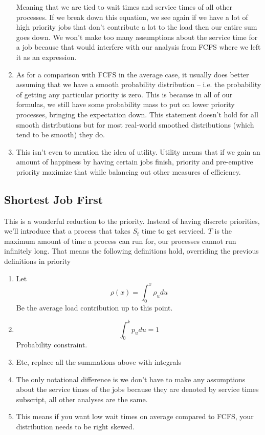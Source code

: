 \begin{enumerate}
  Meaning that we are tied to wait times and service times of all other processes.
  If we break down this equation, we see again if we have a lot of high priority jobs that don't contribute a lot to the load then our entire sum goes down.
  We won't make too many assumptions about the service time for a job because that would interfere with our analysis from FCFS where we left it as an expression.

  \item As for a comparison with FCFS in the average case, it usually does better assuming that we have a smooth probability distribution -- i.e. the probability of getting any particular priority is zero.
  This is because in all of our formulas, we still have some probability mass to put on lower priority processes, bringing the expectation down.
  This statement doesn't hold for all smooth distributions but for most real-world smoothed distributions (which tend to be smooth) they do.

\item This isn't even to mention the idea of utility.
  Utility means that if we gain an amount of happiness by having certain jobs finish, priority and pre-emptive priority maximize that while balancing out other measures of efficiency.
\end{enumerate}


\subsection{Shortest Job First}
This is a wonderful reduction to the priority.
Instead of having discrete priorities, we'll introduce that a process that takes $S_t$ time to get serviced.
$T$ is the maximum amount of time a process can run for, our processes cannot run infinitely long.
That means the following definitions hold, overriding the previous definitions in priority

\begin{enumerate}
\item Let
  \[
  \rho(x) = \int_0^x \rho_u du
  \]
  Be the average load contribution up to this point.
\item
  \[
  \int_0^k p_u du = 1
  \] Probability constraint.
\item Etc, replace all the summations above with integrals
\item The only notational difference is we don't have to make any assumptions about the service times of the jobs because they are denoted by service times subscript, all other analyses are the same.
  \item This means if you want low wait times on average compared to FCFS, your distribution needs to be right skewed.
\end{enumerate}

